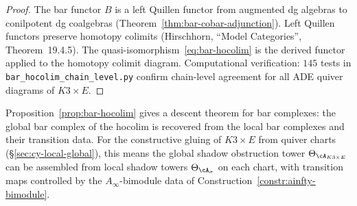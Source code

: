 \begin{proof}
The bar functor $B$ is a left Quillen functor from augmented dg
algebras to conilpotent dg coalgebras
(Theorem~\ref{thm:bar-cobar-adjunction}). Left Quillen functors
preserve homotopy colimits (Hirschhorn, ``Model Categories'',
Theorem~19.4.5). The quasi-isomorphism~\eqref{eq:bar-hocolim}
is the derived functor applied to the homotopy colimit diagram.
Computational verification: $145$ tests in
\texttt{bar\_hocolim\_chain\_level.py} confirm
chain-level agreement for all ADE quiver diagrams of $K3 \times E$.
\end{proof}

\begin{remark}
\label{rem:bar-descent}
Proposition~\ref{prop:bar-hocolim} gives a descent theorem for
bar complexes: the global bar complex of the hocolim is recovered
from the local bar complexes and their transition data. For the
constructive gluing of $K3 \times E$ from quiver charts
(\S\ref{sec:cy-local-global}), this means the global shadow
obstruction tower $\Theta_{\cA_{K3 \times E}}$ can be assembled
from local shadow towers $\Theta_{\cA_\sigma}$ on each chart,
with transition maps controlled by the $A_\infty$-bimodule data
of Construction~\ref{constr:ainfty-bimodule}.
\end{remark}


